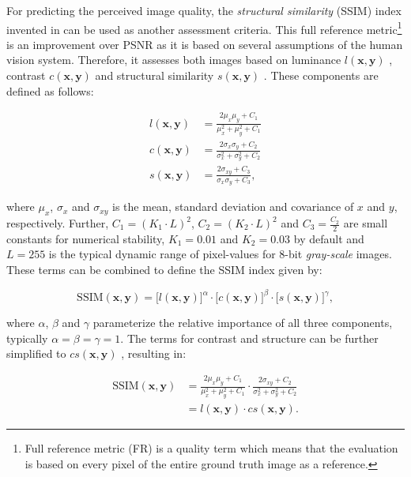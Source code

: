 For predicting the perceived image quality, the \textit{structural similarity} (SSIM) index invented in \parencite{ssim} can be used as another assessment criteria. This full reference metric\footnote{Full reference metric (FR) is a quality term which means that the evaluation is based on every pixel of the entire ground truth image as a reference.} is an improvement over PSNR as it is based on several assumptions of the human vision system. Therefore, it assesses both images based on luminance $ l(\textbf{x}, \textbf{y}) $ , contrast $ c(\textbf{x}, \textbf{y}) $ and structural similarity $ s(\textbf{x}, \textbf{y}) $ \parencite{ms-ssim}. These components are defined as follows:

\begin{equation} \label{eq:ssim-components}
\begin{aligned}
l(\textbf{x}, \textbf{y}) &= \frac{2 \mu_x \mu_y + C_1}{\mu_x^2 + \mu_y^2 + C_1} \\
c(\textbf{x}, \textbf{y}) &= \frac{2 \sigma_x \sigma_y + C_2}{\sigma_x^2 + \sigma_y^2 + C_2} \\
s(\textbf{x}, \textbf{y}) &= \frac{2 \sigma_{xy} + C_3}{\sigma_x \sigma_y + C_3} ,
\end{aligned}
\end{equation}

where $ \mu_x $, $ \sigma_x $ and $ \sigma_{xy} $ is the mean, standard deviation and covariance of $ x $ and $ y $, respectively. Further, $ C_1 = (K_1 \cdot L)^2 $, $ C_2 = (K_2 \cdot L)^2 $ and $ C_3 = \frac{C_2}{2} $ are small constants for numerical stability, $K_1 = 0.01$ and $ K_2 = 0.03 $ by default and $ L=255 $ is the typical dynamic range of pixel-values for 8-bit \textit{gray-scale} images. These terms can be combined to define the SSIM index given by:

\begin{equation} \label{eq:ssim-combined}
\textrm{SSIM}(\textbf{x}, \textbf{y}) = \big[ l(\textbf{x}, \textbf{y})\big]^{\alpha} \cdot \big[c(\textbf{x}, \textbf{y}) \big]^{\beta} \cdot \big[ s(\textbf{x}, \textbf{y}) \big]^{\gamma} ,
\end{equation}

where $ \alpha $, $ \beta $ and $ \gamma $ parameterize the relative importance of all three components, typically $ \alpha = \beta = \gamma = 1 $. The terms for contrast and structure can be further simplified to $ cs(\textbf{x}, \textbf{y}) $ \parencite[p. 5]{loss-func-img-proc}, resulting in:

\begin{equation} \label{eq:ssim-simplified}
\begin{aligned}
\textrm{SSIM}(\textbf{x}, \textbf{y}) &= \frac{2 \mu_x \mu_y + C_1}{\mu_x^2 + \mu_y^2 + C_1} \cdot \frac{2 \sigma_{xy} + C_2}{\sigma_x^2 + \sigma_y^2 + C_2} \\
&= l(\textbf{x}, \textbf{y}) \cdot cs(\textbf{x}, \textbf{y}) .
\end{aligned}
\end{equation}

